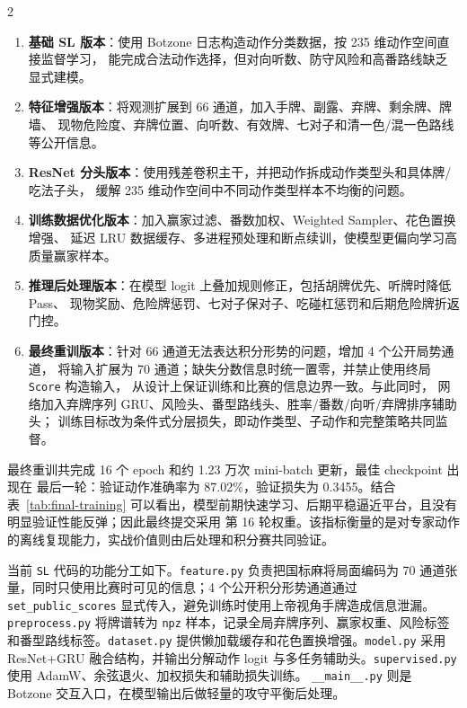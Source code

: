 \documentclass{article}
\begin{document}
\begin{multicols}{2}
\begin{enumerate}
  \item \textbf{基础 SL 版本}：使用 Botzone 日志构造动作分类数据，按 235 维动作空间直接监督学习，
  能完成合法动作选择，但对向听数、防守风险和高番路线缺乏显式建模。
  \item \textbf{特征增强版本}：将观测扩展到 66 通道，加入手牌、副露、弃牌、剩余牌、牌墙、
  现物危险度、弃牌位置、向听数、有效牌、七对子和清一色/混一色路线等公开信息。
  \item \textbf{ResNet 分头版本}：使用残差卷积主干，并把动作拆成动作类型头和具体牌/吃法子头，
  缓解 235 维动作空间中不同动作类型样本不均衡的问题。
  \item \textbf{训练数据优化版本}：加入赢家过滤、番数加权、Weighted Sampler、花色置换增强、
  延迟 LRU 数据缓存、多进程预处理和断点续训，使模型更偏向学习高质量赢家样本。
  \item \textbf{推理后处理版本}：在模型 logit 上叠加规则修正，包括胡牌优先、听牌时降低 Pass、
  现物奖励、危险牌惩罚、七对子保对子、吃碰杠惩罚和后期危险牌折返门控。
  \item \textbf{最终重训版本}：针对 66 通道无法表达积分形势的问题，增加 4 个公开局势通道，
  将输入扩展为 70 通道；缺失分数信息时统一置零，并禁止使用终局 \texttt{Score} 构造输入，
  从设计上保证训练和比赛的信息边界一致。与此同时，
  网络加入弃牌序列 GRU、风险头、番型路线头、胜率/番数/向听/弃牌排序辅助头；
  训练目标改为条件式分层损失，即动作类型、子动作和完整策略共同监督。
\end{enumerate}

最终重训共完成 16 个 epoch 和约 1.23 万次 mini-batch 更新，最佳 checkpoint 出现在
最后一轮：验证动作准确率为 87.02\%，验证损失为 0.3455。结合表~\ref{tab:final-training}
可以看出，模型前期快速学习、后期平稳逼近平台，且没有明显验证性能反弹；因此最终提交采用
第 16 轮权重。该指标衡量的是对专家动作的离线复现能力，实战价值则由后处理和积分赛共同验证。

当前 \texttt{SL} 代码的功能分工如下。\texttt{feature.py} 负责把国标麻将局面编码为
70 通道张量，同时只使用比赛时可见的信息；4 个公开积分形势通道通过 \texttt{set\_public\_scores}
显式传入，避免训练时使用上帝视角手牌造成信息泄漏。\texttt{preprocess.py} 将牌谱转为
\texttt{npz} 样本，记录全局弃牌序列、赢家权重、风险标签和番型路线标签。\texttt{dataset.py}
提供懒加载缓存和花色置换增强。\texttt{model.py} 采用 ResNet+GRU 融合结构，并输出分解动作
logit 与多任务辅助头。\texttt{supervised.py} 使用 AdamW、余弦退火、加权损失和辅助损失训练。
\texttt{\_\_main\_\_.py} 则是 Botzone 交互入口，在模型输出后做轻量的攻守平衡后处理。


\end{multicols}
\end{document}
